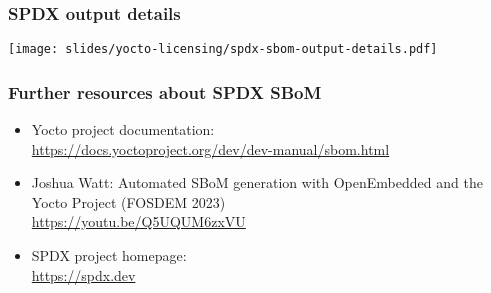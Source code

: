 \begin{frame}[fragile]
  \frametitle{SPDX output details}
  \texttt{[image: slides/yocto-licensing/spdx-sbom-output-details.pdf]}
\end{frame}

\begin{frame}
  \frametitle{Further resources about SPDX SBoM}
    \begin{itemize}
       \item Yocto project documentation:\\
	     \url{https://docs.yoctoproject.org/dev/dev-manual/sbom.html}
       \item Joshua Watt: Automated SBoM generation with OpenEmbedded and the Yocto Project (FOSDEM 2023) \\
	     \url{https://youtu.be/Q5UQUM6zxVU}
       \item SPDX project homepage:\\
	     \url{https://spdx.dev}
    \end{itemize}
\end{frame}

